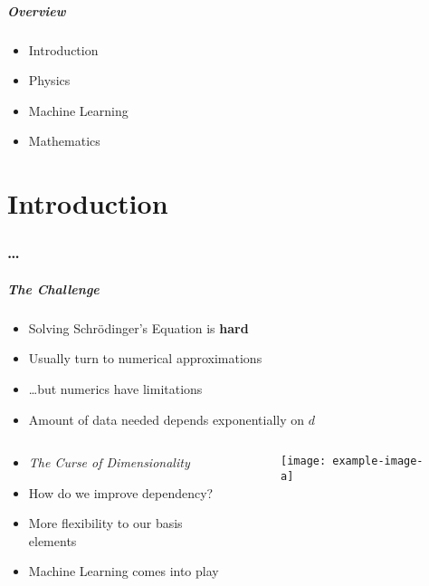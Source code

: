 \begin{frame}
    \frametitle{Overview}
    \begin{itemize}[<+>]
        \item {Introduction}
        \item {Physics}
        \item {Machine Learning}
        \item {Mathematics}
    \end{itemize}
\end{frame}
\part[Part slide]{Introduction}
\makepart%

\section{\ldots}

\begin{frame}[t,label=intro]
\frametitle{The Challenge}

\begin{itemize}[<+->]
    \setlength\itemsep{.8em}
    \item Solving Schrödinger's Equation is \textbf{hard}
    \item Usually turn to numerical approximations
    \item \ldots but numerics have limitations
    \item Amount of data needed depends exponentially on $d$
\end{itemize}

\begin{columns}
    \begin{column}[t]{0.48\textwidth}
        \begin{itemize}[<+->]
            \setlength\itemsep{.8em}
            \item \textit{The Curse of Dimensionality}
            \item How do we improve dependency?
            \item More flexibility to our basis elements 
            \item Machine Learning comes into play
        \end{itemize}
    \end{column}
    \begin{column}[t]{0.48\textwidth}
        \begin{figure}
            \texttt{[image: example-image-a]}
        \end{figure}
    \end{column}
\end{columns}


\end{frame}
